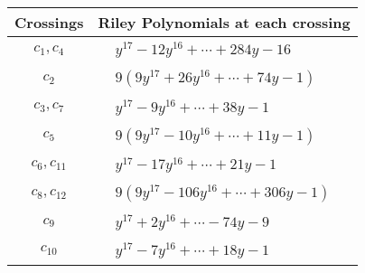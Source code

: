\documentclass[1p]{elsarticle_modified}
\theoremstyle{definition}
\begin{document}
\begin{tabular}{m{50pt}|m{274pt}}
Crossings & \hspace{64pt}Riley Polynomials at each crossing \\
\hline $$\begin{aligned}c_{1},c_{4}\end{aligned}$$&$\begin{aligned}
&y^{17}-12 y^{16}+\cdots+284 y-16
\end{aligned}$\\
\hline $$\begin{aligned}c_{2}\end{aligned}$$&$\begin{aligned}
&9(9 y^{17}+26 y^{16}+\cdots+74 y-1)
\end{aligned}$\\
\hline $$\begin{aligned}c_{3},c_{7}\end{aligned}$$&$\begin{aligned}
&y^{17}-9 y^{16}+\cdots+38 y-1
\end{aligned}$\\
\hline $$\begin{aligned}c_{5}\end{aligned}$$&$\begin{aligned}
&9(9 y^{17}-10 y^{16}+\cdots+11 y-1)
\end{aligned}$\\
\hline $$\begin{aligned}c_{6},c_{11}\end{aligned}$$&$\begin{aligned}
&y^{17}-17 y^{16}+\cdots+21 y-1
\end{aligned}$\\
\hline $$\begin{aligned}c_{8},c_{12}\end{aligned}$$&$\begin{aligned}
&9(9 y^{17}-106 y^{16}+\cdots+306 y-1)
\end{aligned}$\\
\hline $$\begin{aligned}c_{9}\end{aligned}$$&$\begin{aligned}
&y^{17}+2 y^{16}+\cdots-74 y-9
\end{aligned}$\\
\hline $$\begin{aligned}c_{10}\end{aligned}$$&$\begin{aligned}
&y^{17}-7 y^{16}+\cdots+18 y-1
\end{aligned}$\\
\hline
\end{tabular}\\~\\
\end{document}
